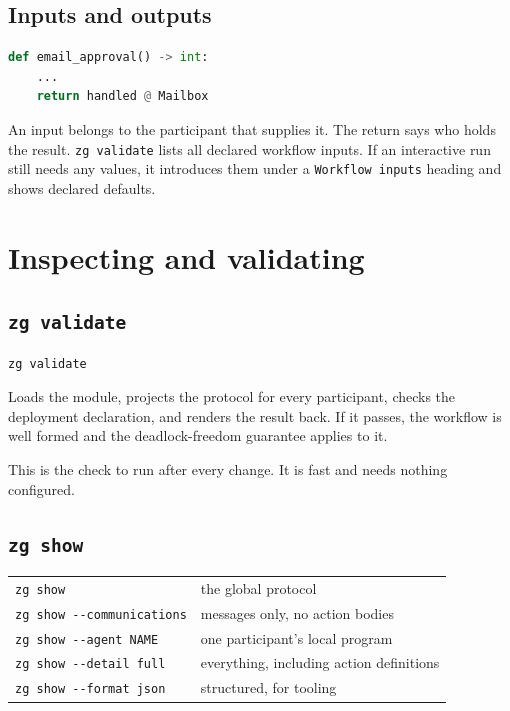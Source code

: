 \documentclass[11pt,a4paper]{article}
\begin{document}
\subsection{Inputs and outputs}

\begin{lstlisting}[language=Python]
def email_approval() -> int:
    ...
    return handled @ Mailbox
\end{lstlisting}

An input belongs to the participant that supplies it. The return says who holds
the result. \texttt{zg validate} lists all declared workflow inputs. If an
interactive run still needs any values, it introduces them under a
\texttt{Workflow inputs} heading and shows declared defaults.

\section{Inspecting and validating}

\subsection{\texttt{zg validate}}

\begin{lstlisting}[style=shell]
zg validate
\end{lstlisting}

Loads the module, projects the protocol for every participant, checks the
deployment declaration, and renders the result back. If it passes, the workflow
is well formed and the deadlock-freedom guarantee applies to it.

This is the check to run after every change. It is fast and needs nothing
configured.

\subsection{\texttt{zg show}}

\begin{center}
\begin{tabularx}{0.95\linewidth}{@{}lX@{}}
\toprule
\texttt{zg show} & the global protocol \\
\texttt{zg show -{}-communications} & messages only, no action bodies \\
\texttt{zg show -{}-agent NAME} & one participant's local program \\
\texttt{zg show -{}-detail full} & everything, including action definitions \\
\texttt{zg show -{}-format json} & structured, for tooling \\
\bottomrule
\end{tabularx}
\end{center}
\end{document}
